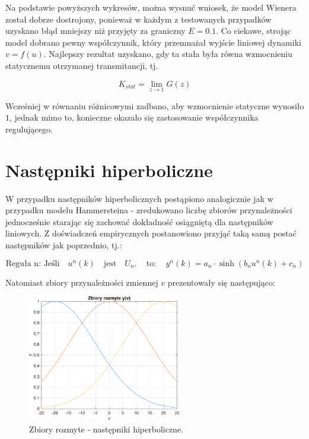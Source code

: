 Na podstawie powyższych wykresów, można wysnuć wniosek, że model Wienera został dobrze dostrojony, ponieważ w każdym z testowanych przypadków uzyskano błąd mniejszy niż przyjęty za graniczny $E = \num{0.1}$. Co ciekawe, strojąc model dobrano pewny współczynnik, który przemnażał wyjście liniowej dynamiki $v = f(u)$. Najlepszy rezultat uzyskano, gdy ta stała była równa wzmocnieniu statycznemu otrzymanej transmitancji, tj.

\begin{equation}
K_{stat} = \lim_{z \to 1} G(z)
\end{equation}

Wcześniej w równaniu różnicowymi zadbano, aby wzmocnienie statyczne wynosiło $1$, jednak mimo to, konieczne okazało się zastosowanie współczynnika regulującego. 

\newpage

\section{Następniki hiperboliczne}
W przypadku następników hiperbolicznych postąpiono analogicznie jak w przypadku modelu Hammersteina - zredukowano liczbę zbiorów przynależności jednocześnie starając się zachować dokładność osiągniętą dla następników liniowych. Z doświadczeń empirycznych postanowiono przyjąć taką samą postać następników jak poprzednio, tj.:

\begin{equation}
\text{Reguła n: Jeśli} \quad u^n(k) \quad \text{jest} \quad U_n, \quad \text{to}: \quad y^n(k) = a_n \cdot \sinh(b_n u^n(k) + c_n)
\end{equation}

Natomiast zbiory przynależności zmiennej $v$ prezentowały się następująco:

\begin{figure}[h!]
\centering
\includegraphics[width=0.6\textwidth]{pictures/fuzzy_set_wien_nlin}
\caption{Zbiory rozmyte - następniki hiperboliczne.}
\end{figure}

